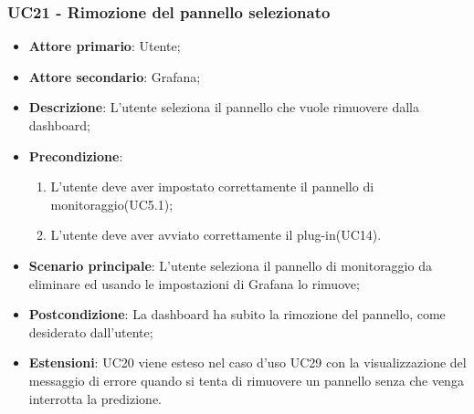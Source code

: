 \subsubsection{UC21 - Rimozione del pannello selezionato}
\label{sssec:uc21}
\begin{itemize}
  \item \textbf{Attore primario}: Utente;
  \item \textbf{Attore secondario}: Grafana;
  \item \textbf{Descrizione}: L'utente seleziona il pannello che vuole rimuovere dalla dashboard;
  \item \textbf{Precondizione}:
  \begin{enumerate}
		\item L'utente deve aver impostato correttamente il pannello di monitoraggio(UC5.1);
		\item L'utente deve aver avviato correttamente il plug-in(UC14).
	\end{enumerate}
  \item \textbf{Scenario principale}: L'utente seleziona il pannello di monitoraggio da eliminare ed usando le impostazioni di Grafana lo rimuove;
  \item \textbf{Postcondizione}: La dashboard ha subito la rimozione del pannello, come desiderato dall'utente;
  \item \textbf{Estensioni}: UC20 viene esteso nel caso d'uso UC29 con la visualizzazione del messaggio di errore quando si tenta di rimuovere un pannello senza che venga interrotta la predizione.
\end{itemize}
